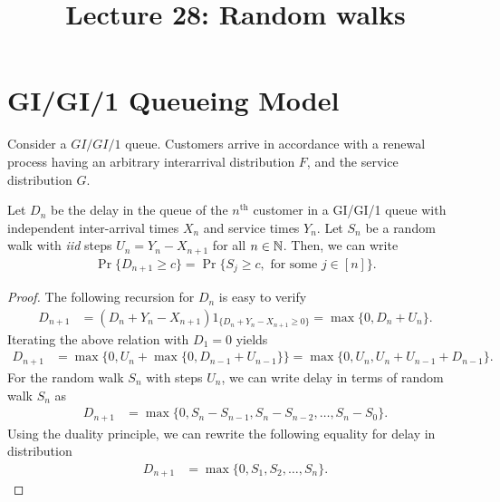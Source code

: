 \documentclass[a4paper,10pt,english]{article}
\title{Lecture 28: Random walks}
\author{}
\begin{document}
\maketitle


\section{ GI/GI/1 Queueing Model}
Consider a $GI/GI/1$ queue. Customers arrive in accordance with a renewal process having an arbitrary interarrival distribution  $F$, and the service distribution $G$. %
\begin{prop}
\label{prop_gigi1}
Let $D_n$ be the delay in the queue of the $n^\text{th}$ customer in a GI/GI/1 queue with independent inter-arrival times $X_n$ and service times $Y_n$. 
Let $S_n$ be a random walk with \textit{iid} steps $U_n = Y_n - X_{n+1}$ for all $n \in \mathbb{N}$. 
Then, we can write
\begin{align}
\label{GIGI1_prop_eqn}
\Pr\{D_{n+1} \geq c\} = \Pr\{S_j \geq c, \text{ for some }j \in [n]\}.
\end{align}
\end{prop}
\begin{proof}
The following recursion for $D_n$ is easy to verify
\begin{align*}
 D_{n+1} &= (D_n+Y_n-X_{n+1})1_{\{D_n+Y_n - X_{n+1} \geq 0\}} = \max\{0,D_n+U_n\}.
\end{align*}
Iterating the above relation with $D_1 = 0$ yields
\begin{align*}
D_{n+1}&= \max\{0,U_n+\max\{0,D_{n-1}+U_{n-1}\}\}=\max\{0,U_n,U_n+U_{n-1}+D_{n-1}\}.
\end{align*}
For the random walk $S_n$ with steps $U_n$, we can write delay in terms of random walk $S_n$ as
\begin{align*}
D_{n+1} &=\max\{0,S_n-S_{n-1},S_n-S_{n-2}, \ldots, S_n - S_0\}.
\end{align*}
Using the duality principle, we can rewrite the following equality for delay in distribution  
\begin{align*}
D_{n+1} &=\max\{0,S_1,S_2, \ldots , S_n\}.
\end{align*}
\end{proof}
\end{document}
